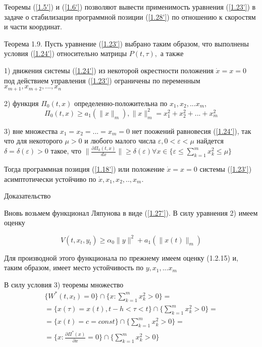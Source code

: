 Теоремы (\ref{1.5'}) и (\ref{1.6'}) позволяют вывести применимость уравнения (\ref{1.23'}) в задаче о стабилизации программной позиции (\ref{1.28'}) по отношению к скоростям и части координат. 

\begin{theorem}\label{t-1.9}
Теорема 1.9. Пусть уравнение (\ref{1.23'}) выбрано таким образом, что выполнены условия (\ref{1.24'}) относительно матрицы $P(t, \tau),$ а также 

1) движения системы (\ref{1.24'}) из некоторой окрестности положения $\dot x = x= 0$ под действием управления (\ref{1.23'}) ограничены по переменным $x_{m+1}, x_{m+2}, ... , x_n$ 

2) функция $\Pi_0 (t, x)$ определенно-положительна по $x_1, x_2, ... x_m$,
$$\Pi_0(t, x) \ge a_1 (\| x \|_m), \| x \|^2_m = x_1^2 + x_2^2 + ... + x_m^2$$

3) вне множества ${x_1 = x_2 = ... = x_m = 0}$ нет поожений равновесия (\ref{1.24'}), так что для некоторого $\mu > 0$ и любого малого числа  $\varepsilon, 0 < \varepsilon < \mu$ найдется $\delta = \delta(\varepsilon) > 0$ такое, что $\| \frac{\partial \Pi_0 (t, x)}{dx} \| \ge \delta(\varepsilon) \forall x \in \lbrace \varepsilon \le \sum_{k = 1}^{m} x_k^2 \le \mu \rbrace$

Тогда программная позиция (\ref{1.18'}) или положение $\dot x = x = 0$ системы (\ref{1.23'}) асимптотически устойчиво по $\dot x, x_1, x_2,.., x_m.$
\end{theorem}

Доказательство 

Вновь возьмем функционал Ляпунова в виде (\ref{1.27'}). В силу уравнения 2) имеем оценку

\begin{equation}
V(t, x_t, y_t) \ge \alpha_0 \| y \| ^2 + a_1 (\| x(t) \|_m)
\end{equation}

Для производной этого функционала по прежнему имеем оценку (1.2.15) и, таким образом, имеет место устойчивость по $y, x_1, ... x_m$

В силу условия 3) теоремы множество 
$$
\begin{array}{c}
\lbrace W^{*} (t, x_t) = 0 \rbrace \cap \lbrace x : \sum_{k = 1}^{m} x_k^2 > 0 \rbrace =\\
= \lbrace x(\tau) = x(t), t - h < \tau < t \rbrace \cap \lbrace \sum_{k = 1}^{m} x_k^2 > 0 \rbrace =\\
= \lbrace x(t) = c = const \rbrace \cap \lbrace \sum_{k = 1}^{m} x_k^2 > 0 \rbrace =\\
= \lbrace x: \frac{\partial \Pi^{*} (x)}{\partial x} = 0 \rbrace \cap \lbrace \sum_{k = 1}^{m} x_k^2 > 0 \rbrace
\end{array}
$$


